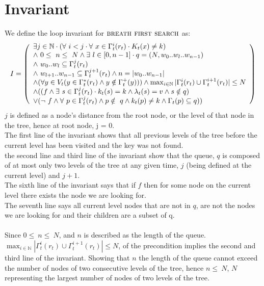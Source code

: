 \documentclass[headings=small,a4paper,12pt]{scrartcl}
\newcommand{\bfs}{\textsc{breath first search}\xspace}
\begin{document}
\section{Invariant}
\label{sec:invariant}
\text We define the loop invariant for $\bfs$ as:\\
\begin{align*}
    &I = \left(
    \begin{array}{l}
         \exists j\in \mathbb{N}\cdot{}(\forall~i<j\cdot{}\forall~x \in \Gamma^{i}_t(r_t)\cdot{}K_t(x) \ne k)\\
         \wedge~0\leq~n\leq~N\wedge \exists~l\in[0,n-1] \cdot{}q = (N,w_0..w_l..w_{n-1})\\
         \wedge~w_0..w_l\subseteq\Gamma^j_t(r_t)\\
         \wedge~w_{l+1}..w_{n-1} \subseteq \Gamma^{j+1}_t(r_t)\wedge n = |w_0..w_{n-1}|\\
         \wedge (\forall y\in V_t(y\in \Gamma^{*}_{t}(r_t)\wedge y \notin\Gamma^{+}_{t}(y)))\wedge\max_{i\in\mathbb{N}}|\Gamma_t^{i}(r_t)\cup\Gamma_{t}^{i+1}(r_t)|\leq N\\
         \wedge ((f\wedge\exists~s\in \Gamma^{j}_{t}(r_t)\cdot{}k_t(s) = k\wedge \lambda_t(s) = v\wedge s\notin q)\\
         \vee (\neg~f \wedge \forall~p \in \Gamma^j_t(r_t) \wedge p\notin~q \wedge k_t(p) \ne k \wedge \Gamma_t(p) \subseteq q))
    \end{array}
    \right)\\
\end{align*}
$j$ is defined as a node's distance from the root node, or the level of that node in the tree, hence at root node, j = 0.\\
%
The first line of the invariant shows that all previous levels of the tree before the current level has been visited and the key was not found.\\
the second line and third line of the invariant show that the queue, $q$ is composed of at most only two levels of the tree at any given time, $j$ (being defined at the current level) and $j+1$.\\
The sixth line of the invariant says that if $f$ then for some node on the current level there exists the node we are looking for.\\
The seventh line says all current level nodes that are not in $q$, are not the nodes we are looking for and their children are a subset of q.\\
\\
Since $0\leq~n\leq~N$, and $n$ is described as the length of the queue.\\ $\max_{i\in\mathbb{N}}|\Gamma_t^{i}(r_t)\cup\Gamma_{t}^{i+1}(r_t)|\leq N$, of the precondition implies the second and third line of the invariant. Showing that $n$ the length of the queue cannot exceed the number of nodes of two consecutive levels of the tree, hence $n\leq~N$, $N$ representing the largest number of nodes of two levels of the tree.\\
\end{document}
